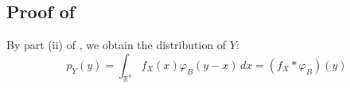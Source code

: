 \documentclass[a4paper,10pt]{article}
\begin{document}









\subsection{Proof of }\label{sec:proof_formule_de_Tweedie}
By part (ii) of , we obtain the distribution of $Y$:
\begin{equation*}
p_Y(y) = \int_{\mathbb{R}^n} f_X(x) \varphi_B(y - x) \, dx = (f_X * \varphi_B)(y)
\end{equation*}
\end{document}

